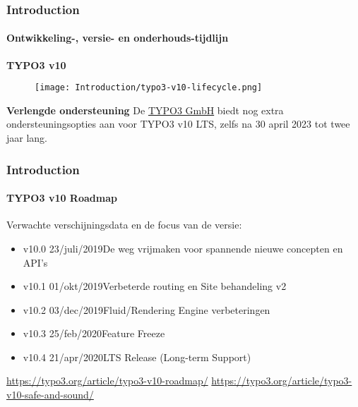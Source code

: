 
\begin{frame}[fragile]
	\frametitle{Introduction}
	\framesubtitle{Ontwikkeling-, versie- en onderhouds-tijdlijn}

	\textbf{TYPO3 v10}

	\begin{figure}
		\texttt{[image: Introduction/typo3-v10-lifecycle.png]}
	\end{figure}

	\textbf{Verlengde ondersteuning}\newline
	\smaller
	De \href{https://typo3.com}{TYPO3 GmbH} biedt nog extra ondersteuningsopties aan
	voor TYPO3 v10 LTS, zelfs na 30 april 2023 tot twee jaar lang.
	\normalsize

\end{frame}


\begin{frame}[fragile]
	\frametitle{Introduction}
	\framesubtitle{TYPO3 v10 Roadmap}

	Verwachte verschijningsdata en de focus van de versie:

	\begin{itemize}

		\item v10.0 \tabto{1.1cm}23/juli/2019\tabto{3.4cm}De weg vrijmaken voor spannende nieuwe concepten en API's
		\item v10.1 \tabto{1.1cm}01/okt/2019\tabto{3.4cm}Verbeterde routing en Site behandeling v2
		\item v10.2 \tabto{1.1cm}03/dec/2019\tabto{3.4cm}Fluid/Rendering Engine verbeteringen
		\item
			\begingroup
				\color{typo3orange}
				v10.3 \tabto{1.1cm}25/feb/2020\tabto{3.4cm}Feature Freeze
			\endgroup
		\item v10.4 \tabto{1.1cm}21/apr/2020\tabto{3.4cm}LTS Release (Long-term Support)

	\end{itemize}

	\vspace{0.6cm}
	\smaller
		\url{https://typo3.org/article/typo3-v10-roadmap/}\newline
		\url{https://typo3.org/article/typo3-v10-safe-and-sound/}
	\normalsize

\end{frame}


